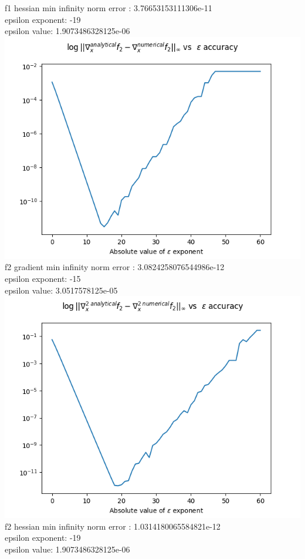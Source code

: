 \documentclass[12pt]{article}
\begin{document}
f1 hessian min infinity norm error : 3.76653153111306e-11\\
epsilon exponent: -19\\
epsilon value: 1.9073486328125e-06\\
\includegraphics[scale=0.7]{f2_grad_plot}\\
f2 gradient min infinity norm error : 3.0824258076544986e-12\\
epsilon exponent: -15\\
epsilon value: 3.0517578125e-05\\
\includegraphics[scale=0.7]{f2_hessian_plot}\\
f2 hessian min infinity norm error : 1.0314180065584821e-12\\
epsilon exponent: -19\\
epsilon value: 1.9073486328125e-06\\
\end{document}
